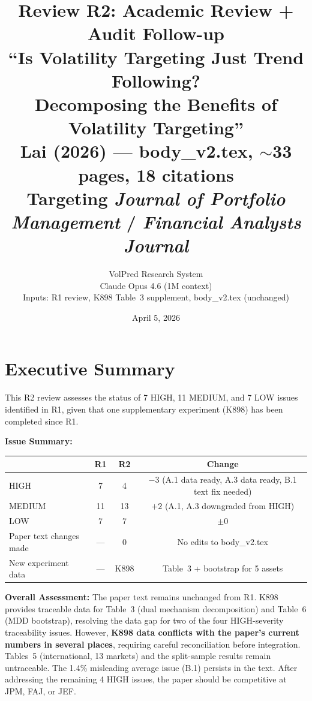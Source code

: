 \documentclass[12pt,a4paper]{article}
\title{Review R2: Academic Review + Audit Follow-up\\[6pt]
\Large ``Is Volatility Targeting Just Trend Following?\\
Decomposing the Benefits of Volatility Targeting''\\[6pt]
\normalsize Lai (2026) --- body\_v2.tex, $\sim$33 pages, 18 citations\\
\normalsize Targeting \textit{Journal of Portfolio Management} / \textit{Financial Analysts Journal}}
\author{VolPred Research System\\
\small Claude Opus 4.6 (1M context)\\[3pt]
\small Inputs: R1 review, K898 Table~3 supplement, body\_v2.tex (unchanged)}
\date{April 5, 2026}
\begin{document}
\maketitle

\tableofcontents
\newpage

\section{Executive Summary}

This R2 review assesses the status of 7 HIGH, 11 MEDIUM, and 7 LOW issues identified in R1, given that one supplementary experiment (K898) has been completed since R1.

\medskip
\noindent\textbf{Issue Summary:}

\begin{center}
\begin{tabular}{lccc}
\toprule
& R1 & R2 & Change \\
\midrule
HIGH    & 7 & 4 & $-3$ (A.1 data ready, A.3 data ready, B.1 text fix needed) \\
MEDIUM  & 11 & 13 & $+2$ (A.1, A.3 downgraded from HIGH) \\
LOW     & 7 & 7 & $\pm 0$ \\
\midrule
Paper text changes made & --- & 0 & No edits to body\_v2.tex \\
New experiment data & --- & K898 & Table~3 + bootstrap for 5 assets \\
\bottomrule
\end{tabular}
\end{center}

\noindent\textbf{Overall Assessment:} The paper text remains unchanged from R1. K898 provides traceable data for Table~3 (dual mechanism decomposition) and Table~6 (MDD bootstrap), resolving the data gap for two of the four HIGH-severity traceability issues. However, \textbf{K898 data conflicts with the paper's current numbers in several places}, requiring careful reconciliation before integration. Tables~5 (international, 13 markets) and the split-sample results remain untraceable. The 1.4\% misleading average issue (B.1) persists in the text. After addressing the remaining 4 HIGH issues, the paper should be competitive at JPM, FAJ, or JEF.


\end{document}
